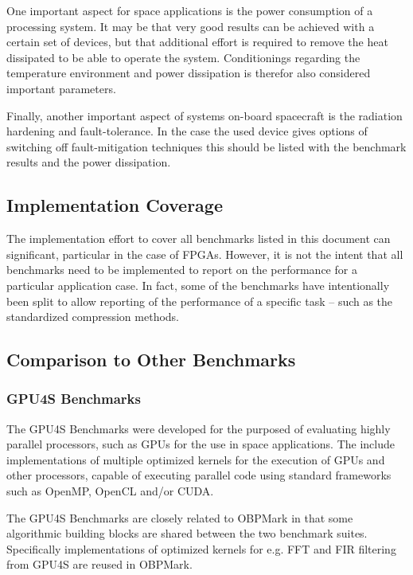 One important aspect for space applications is the power consumption of a processing system. It may be that very good results can be achieved with a certain set of devices, but that additional effort is required to remove the heat dissipated to be able to operate the system. Conditionings regarding the temperature environment and power dissipation is therefor also considered important parameters. 

Finally, another important aspect of systems on-board spacecraft is the radiation hardening and fault-tolerance. In the case the used device gives options of switching off fault-mitigation techniques this should be listed with the benchmark results and the power dissipation.

\subsection{Implementation Coverage}
The implementation effort to cover all benchmarks listed in this document can significant, particular in the case of FPGAs. However, it is not the intent that all benchmarks need to be implemented to report on the performance for a particular application case. In fact, some of the benchmarks have intentionally been split to allow reporting of the performance of a specific task – such as the standardized compression methods. 

\subsection{Comparison to Other Benchmarks}

\subsubsection{GPU4S Benchmarks}
The GPU4S Benchmarks were developed for the purposed of evaluating highly parallel processors, such as GPUs for the use in space applications. The include implementations of multiple optimized kernels for the execution of GPUs and other processors, capable of executing parallel code using standard frameworks such as OpenMP, OpenCL and/or CUDA. 

The GPU4S Benchmarks are closely related to OBPMark in that some algorithmic building blocks are shared between the two benchmark suites. Specifically implementations of optimized kernels for e.g. FFT and FIR filtering from GPU4S are reused in OBPMark.

